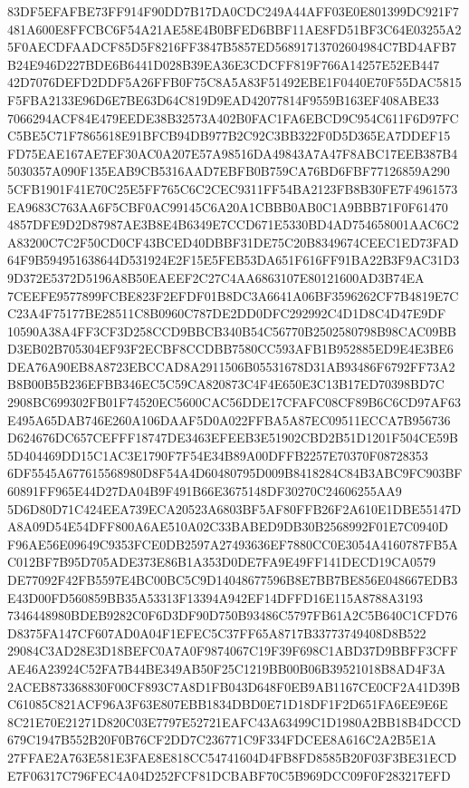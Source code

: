 \documentclass[UTF8,fontset=fandol,zihao=-4,a4paper]{ctexart}
\begin{document}
{{83DF5EFAFBE73FF914F90DD7B17DA0CDC249A44AFF03E0E801399DC921F7481A600E8FFCBC6F54A21AE58E4B0BFED6BBF11AE8FD51BF3C64E03255A2
5F0AECDFAADCF85D5F8216FF3847B5857ED56891713702604984C7BD4AFB7B24E946D227BDE6B6441D028B39EA36E3CDCFF819F766A14257E52EB447
42D7076DEFD2DDF5A26FFB0F75C8A5A83F51492EBE1F0440E70F55DAC5815F5FBA2133E96D6E7BE63D64C819D9EAD42077814F9559B163EF408ABE33
7066294ACF84E479EEDE38B32573A402B0FAC1FA6EBCD9C954C611F6D97FCC5BE5C71F7865618E91BFCB94DB977B2C92C3BB322F0D5D365EA7DDEF15
FD75EAE167AE7EF30AC0A207E57A98516DA49843A7A47F8ABC17EEB387B45030357A090F135EAB9CB5316AAD7EBFB0B759CA76BD6FBF77126859A290
5CFB1901F41E70C25E5FF765C6C2CEC9311FF54BA2123FB8B30FE7F4961573EA9683C763AA6F5CBF0AC99145C6A20A1CBBB0AB0C1A9BBB71F0F61470
4857DFE9D2D87987AE3B8E4B6349E7CCD671E5330BD4AD754658001AAC6C2A83200C7C2F50CD0CF43BCED40DBBF31DE75C20B8349674CEEC1ED73FAD
64F9B594951638644D531924E2F15E5FEB53DA651F616FF91BA22B3F9AC31D39D372E5372D5196A8B50EAEEF2C27C4AA6863107E80121600AD3B74EA
7CEEFE9577899FCBE823F2EFDF01B8DC3A6641A06BF3596262CF7B4819E7CC23A4F75177BE28511C8B0960C787DE2DD0DFC292992C4D1D8C4D47E9DF
10590A38A4FF3CF3D258CCD9BBCB340B54C56770B2502580798B98CAC09BBD3EB02B705304EF93F2ECBF8CCDBB7580CC593AFB1B952885ED9E4E3BE6
DEA76A90EB8A8723EBCCAD8A2911506B05531678D31AB93486F6792FF73A2B8B00B5B236EFBB346EC5C59CA820873C4F4E650E3C13B17ED70398BD7C
2908BC699302FB01F74520EC5600CAC56DDE17CFAFC08CF89B6C6CD97AF63E495A65DAB746E260A106DAAF5D0A022FFBA5A87EC09511ECCA7B956736
D624676DC657CEFFF18747DE3463EFEEB3E51902CBD2B51D1201F504CE59B5D404469DD15C1AC3E1790F7F54E34B89A00DFFB2257E70370F08728353
6DF5545A677615568980D8F54A4D60480795D009B8418284C84B3ABC9FC903BF60891FF965E44D27DA04B9F491B66E3675148DF30270C24606255AA9
5D6D80D71C424EEA739ECA20523A6803BF5AF80FFB26F2A610E1DBE55147DA8A09D54E54DFF800A6AE510A02C33BABED9DB30B2568992F01E7C0940D
F96AE56E09649C9353FCE0DB2597A27493636EF7880CC0E3054A4160787FB5AC012BF7B95D705ADE373E86B1A353D0DE7FA9E49FF141DECD19CA0579
DE77092F42FB5597E4BC00BC5C9D14048677596B8E7BB7BE856E048667EDB3E43D00FD560859BB35A53313F13394A942EF14DFFD16E115A8788A3193
7346448980BDEB9282C0F6D3DF90D750B93486C5797FB61A2C5B640C1CFD76D8375FA147CF607AD0A04F1EFEC5C37FF65A8717B33773749408D8B522
29084C3AD28E3D18BEFC0A7A0F9874067C19F39F698C1ABD37D9BBFF3CFFAE46A23924C52FA7B44BE349AB50F25C1219BB00B06B39521018B8AD4F3A
2ACEB873368830F00CF893C7A8D1FB043D648F0EB9AB1167CE0CF2A41D39BC61085C821ACF96A3F63E807EBB1834DBD0E71D18DF1F2D651FA6EE9E6E
8C21E70E21271D820C03E7797E52721EAFC43A63499C1D1980A2BB18B4DCCD679C1947B552B20F0B76CF2DD7C236771C9F334FDCEE8A616C2A2B5E1A
27FFAE2A763E581E3FAE8E818CC54741604D4FB8FD8585B20F03F3BE31ECDE7F06317C796FEC4A04D252FCF81DCBABF70C5B969DCC09F0F283217EFD
}}
\end{document}
